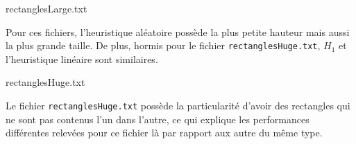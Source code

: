 \begin{table}
\caption{rectanglesLarge.txt}\label{tab:rect1}

\end{table}

Pour ces fichiers, l'heuristique aléatoire possède
la plus petite hauteur mais aussi la plus grande taille.
De plus, hormis pour le fichier \texttt{rectanglesHuge.txt}, $H_1$
et l'heuristique linéaire sont similaires.

\begin{table}
\caption{rectanglesHuge.txt}\label{tab:rect2}

\end{table}

Le fichier \texttt{rectanglesHuge.txt} possède la particularité d'avoir des
rectangles qui ne sont pas contenus l'un dans l'autre, ce qui explique
les performances différentes relevées pour ce fichier là par rapport aux
autre du même type.

